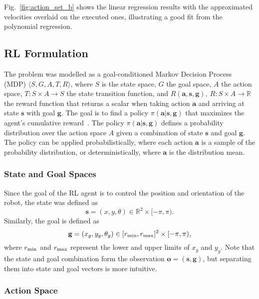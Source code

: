 Fig.\ \ref{fig:action_set_b} shows the linear regression results with the approximated velocities overlaid on the executed ones, illustrating a good fit from the polynomial regression.

\subsection{RL Formulation}

The problem was modelled as a goal-conditioned Markov Decision Process (MDP) $\langle S, G, A, T, R \rangle$, where $S$ is the state space, $G$ the goal space, $A$ the action space, $T: S\times A \rightarrow S$ the state transition function, and $R(\mathbf{a}, \mathbf{s}, \mathbf{g}),~R: S \times A\rightarrow\mathbb{R}$ the reward function that returns a scalar when taking action $\mathbf{a}$ and arriving at state $\mathbf{s}$ with goal $\mathbf{g}$. The goal is to find a policy $\pi(\mathbf{a}|\mathbf{s},\mathbf{g})$ that maximizes the agent's cumulative reward~\cite{antonyshyn2023multiple}. The policy $\pi(\mathbf{a}|\mathbf{s},\mathbf{g})$ defines a probability distribution over the action space $A$ given a combination of state $\mathbf{s}$ and goal $\mathbf{g}$. The policy can be applied probabilistically, where each action $\mathbf{a}$ is a sample of the probability distribution, or deterministically, where $\mathbf{a}$ is the distribution mean.

\subsubsection{State and Goal Spaces}

Since the goal of the RL agent is to control the position and orientation of the robot, the state was defined as
\begin{equation}
    \mathbf{s} = (x, y, \theta)\in\mathbb{R}^2\times[-\pi,\pi).
\end{equation}
Similarly, the goal is defined as
\begin{equation}
    \mathbf{g} = (x_g,y_g,\theta_g) \in[r_{\rm min},r_{\rm max}]^2\times[-\pi,\pi),
\end{equation}
where $r_{\rm min}$ and $r_{\rm max}$ represent the lower and upper limits of $x_g$ and $y_g$. Note that the state and goal combination form the observation $\mathbf{o} = (\mathbf{s},\mathbf{g})$, but separating them into state and goal vectors is more intuitive.

\subsubsection{Action Space}

